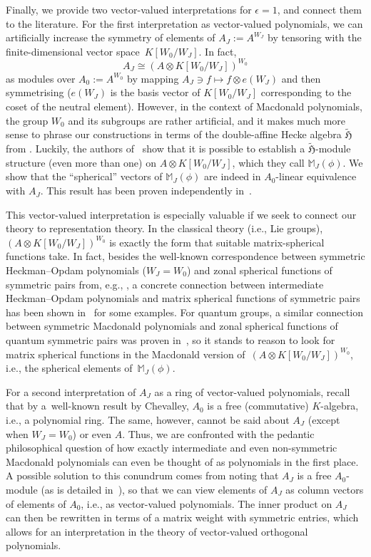 \documentclass[10pt,a4paper]{amsart}
\theoremstyle{definition}
\numberwithin{equation}{section}
\begin{document}
Finally, we provide two vector-valued interpretations for $\epsilon=1$,
and connect them to the literature.
For the first interpretation as vector-valued polynomials, we can artificially increase the symmetry of elements of $A_J:= A^{W_J}$
by tensoring with the finite-dimensional vector space~${K[W_0/W_J]}$. In fact,
\[
 A_J \cong (A\otimes K[W_0/W_J])^{W_0}
\]
as modules over $A_0:= A^{W_0}$ by mapping $A_J\ni f\mapsto f\otimes e(W_J)$ and then symmetrising ($e(W_J)$ is the basis vector of $K[W_0/W_J]$ corresponding to the coset of the neutral element). However, in the context of Macdonald
polynomials, the group $W_0$ and its subgroups are rather artificial,
and it makes much more sense to phrase our constructions in terms of
the double-affine Hecke algebra $\tilde{\mathfrak{H}}$ from
\cite{macdonald}. Luckily, the authors of~\cite{stokmanInduced} show that it is possible to establish a $\tilde{\mathfrak{H}}$-module structure (even more than one) on $A\otimes K[W_0/W_J]$, which they call
$\mathbb{M}_J(\phi)$. We show that the ``spherical'' vectors
of $\mathbb{M}_J(\phi)$ are indeed in $A_0$-linear equivalence with $A_J$.
This result has been proven independently in~\cite{Ven25}.

This vector-valued interpretation is especially valuable if we seek
to connect our theory to representation theory. In the classical theory
(i.e., Lie groups),
$(A\otimes K[W_0/W_J])^{W_0}$ is exactly the form that suitable
matrix-spherical functions take. In fact, besides the well-known
correspondence between symmetric Heckman--Opdam polynomials ($W_J=W_0$)
and zonal spherical functions of symmetric pairs from, e.g., \cite{heckmanSchlichtkrull}, a concrete connection between intermediate
Heckman--Opdam polynomials and matrix spherical functions of symmetric
pairs has been shown in~\cite{mvpBC1,mvpVectorValued} for some examples.
For quantum groups, a similar connection between symmetric Macdonald polynomials
and zonal spherical functions of quantum symmetric pairs was proven
in~\cite{letzter}, so it stands to reason to look for matrix spherical
functions in the Macdonald version of~${(A\otimes K[W_0/W_J])^{W_0}}$, i.e., the spherical elements of~${\mathbb{M}_J(\phi)}$.

For a second interpretation of $A_J$ as a ring of vector-valued
polynomials, recall that by a~well-known result by Chevalley,
$A_0$ is a free (commutative) $K$-algebra,
i.e., a polynomial ring. The same, however, cannot be said about $A_J$
(except when $W_J=W_0$) or even $A$. Thus, we are confronted with the
pedantic philosophical question of how exactly intermediate and even non-symmetric
Macdonald polynomials can even be thought of as polynomials in
the first place. A possible solution to this conundrum comes from noting
that $A_J$ is a free $A_0$-module (as is detailed in~\cite{pittieSteinberg}), so that we
can view elements of $A_J$ as column vectors of elements of $A_0$, i.e.,
as vector-valued polynomials. The inner product on $A_J$ can then be
rewritten in terms of a matrix weight with symmetric entries, which
allows for an interpretation in the theory of vector-valued orthogonal
polynomials.
\end{document}
